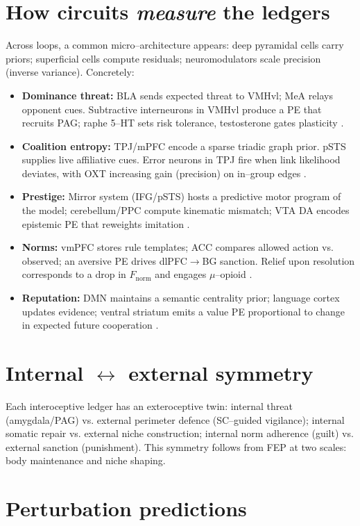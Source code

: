 \documentclass[11pt]{article}
\begin{document}
\section{How circuits \emph{measure} the ledgers}
Across loops, a common micro--architecture appears: deep pyramidal cells carry priors; superficial cells compute residuals; neuromodulators scale precision (inverse variance). Concretely:
\begin{itemize}
  \item \textbf{Dominance threat:} BLA sends expected threat to VMHvl; MeA relays opponent cues. Subtractive interneurons in VMHvl produce a PE that recruits PAG; raphe 5--HT sets risk tolerance, testosterone gates plasticity \cite{Lin2011,Sapolsky2004}.
  \item \textbf{Coalition entropy:} TPJ/mPFC encode a sparse triadic graph prior. pSTS supplies live affiliative cues. Error neurons in TPJ fire when link likelihood deviates, with OXT increasing gain (precision) on in--group edges \cite{Scholz2016,Kosfeld2005}.
  \item \textbf{Prestige:} Mirror system (IFG/pSTS) hosts a predictive motor program of the model; cerebellum/PPC compute kinematic mismatch; VTA DA encodes epistemic PE that reweights imitation \cite{Rizzolatti2004,Schultz1997}.
  \item \textbf{Norms:} vmPFC stores rule templates; ACC compares allowed action vs. observed; an aversive PE drives dlPFC$\to$BG sanction. Relief upon resolution corresponds to a drop in $F_{\mathrm{norm}}$ and engages $\mu$--opioid \cite{Knoch2006,Eisenberger2003}.
  \item \textbf{Reputation:} DMN maintains a semantic centrality prior; language cortex updates evidence; ventral striatum emits a value PE proportional to change in expected future cooperation \cite{Zink2008}.
\end{itemize}

\section{Internal $\leftrightarrow$ external symmetry}
Each interoceptive ledger has an exteroceptive twin: internal threat (amygdala/PAG) vs. external perimeter defence (SC--guided vigilance); internal somatic repair vs. external niche construction; internal norm adherence (guilt) vs. external sanction (punishment). This symmetry follows from FEP at two scales: body maintenance and niche shaping.

\section{Perturbation predictions}
\end{document}
